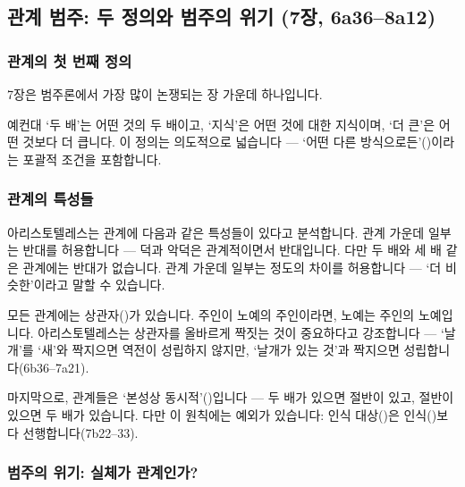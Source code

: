 \documentclass[12pt, a4paper]{article}
\begin{document}
\thispagestyle{firstpage}


\subsection{관계 범주: 두 정의와 범주의 위기 (7장, 6a36--8a12)}

\subsubsection{관계의 첫 번째 정의}

7장은 범주론에서 가장 많이 논쟁되는 장 가운데 하나입니다.


예컨대 `두 배'는 어떤 것의 두 배이고, `지식'은 어떤 것에 대한 지식이며, `더 큰'은 어떤 것보다 더 큽니다. 이 정의는 의도적으로 넓습니다 --- `어떤 다른 방식으로든'()이라는 포괄적 조건을 포함합니다.

\subsubsection{관계의 특성들}

아리스토텔레스는 관계에 다음과 같은 특성들이 있다고 분석합니다. 관계 가운데 일부는 반대를 허용합니다 --- 덕과 악덕은 관계적이면서 반대입니다. 다만 두 배와 세 배 같은 관계에는 반대가 없습니다. 관계 가운데 일부는 정도의 차이를 허용합니다 --- `더 비슷한'이라고 말할 수 있습니다.

모든 관계에는 상관자()가 있습니다. 주인이 노예의 주인이라면, 노예는 주인의 노예입니다. 아리스토텔레스는 상관자를 올바르게 짝짓는 것이 중요하다고 강조합니다 --- `날개'를 `새'와 짝지으면 역전이 성립하지 않지만, `날개가 있는 것'과 짝지으면 성립합니다(6b36--7a21).

마지막으로, 관계들은 `본성상 동시적'()입니다 --- 두 배가 있으면 절반이 있고, 절반이 있으면 두 배가 있습니다. 다만 이 원칙에는 예외가 있습니다: 인식 대상()은 인식()보다 선행합니다(7b22--33).

\subsubsection{범주의 위기: 실체가 관계인가?}
\end{document}
